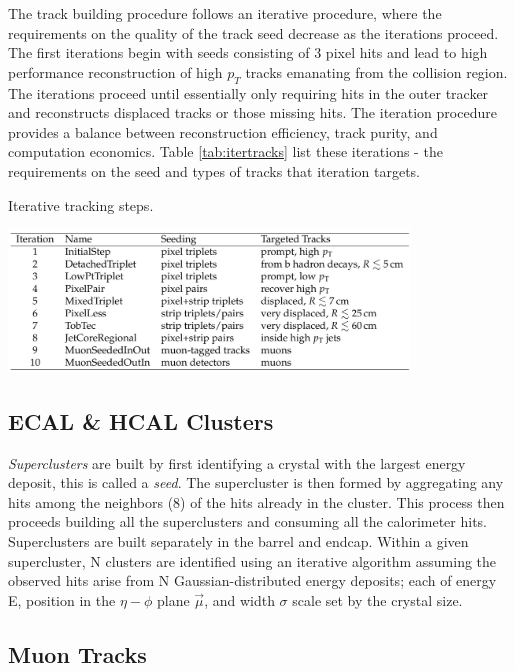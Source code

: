 The track building procedure follows an iterative procedure, where the requirements on the quality of the track seed decrease as the iterations proceed. The first iterations begin with seeds consisting of 3 pixel hits and lead to high performance reconstruction of high $p_{T}$ tracks emanating from the collision region. The iterations proceed until essentially only requiring hits in the outer tracker and reconstructs displaced tracks or those missing hits. The iteration procedure provides a balance between reconstruction efficiency, track purity, and computation economics. Table \ref{tab:itertracks} list these iterations - the requirements on the seed and types of tracks that iteration targets.

\begin{table}[h]
\caption{Iterative tracking steps. \cite{CMS-PRF-14-001}}
\centering
\includegraphics[width=0.8\textwidth]{figs/itertracks.png}
\label{tab:itertracks}
\end{table}

\subsection{ECAL \& HCAL Clusters}

\textit{Superclusters} are built by first identifying a crystal with the largest energy deposit, this is called a \textit{seed}. The supercluster is then formed by aggregating any hits among the neighbors (8) of the hits already in the cluster. This process then proceeds building all the superclusters and consuming all the calorimeter hits. Superclusters are built separately in the barrel and endcap. Within a given supercluster, N clusters are identified using an iterative algorithm assuming the observed hits arise from N Gaussian-distributed energy deposits; each of energy E, position in the $\eta-\phi$ plane $\vec{\mu}$, and width $\sigma$ scale set by the crystal size.

\subsection{Muon Tracks}

